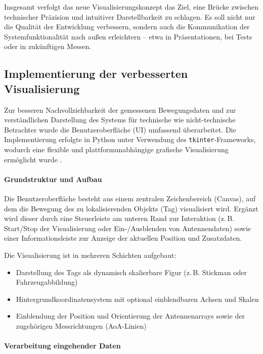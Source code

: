 \documentclass[a4paper, 12pt]{article} %
\begin{document}
Insgesamt verfolgt das neue Visualisierungskonzept das Ziel, eine Brücke zwischen technischer Präzision und intuitiver Darstellbarkeit zu schlagen. 
Es soll nicht nur die Qualität der Entwicklung verbessern, sondern auch die Kommunikation der Systemfunktionalität nach außen erleichtern – etwa in 
Präsentationen, bei Tests oder in zukünftigen Messen.

\subsection{Implementierung der verbesserten Visualisierung}

Zur besseren Nachvollziehbarkeit der gemessenen Bewegungsdaten und zur verständlichen Darstellung des Systems für technische wie nicht-technische 
Betrachter wurde die Benutzeroberfläche (\ac{UI}) umfassend überarbeitet. Die Implementierung erfolgte in Python unter Verwendung des 
\texttt{tkinter}-Frameworks, wodurch eine flexible und plattformunabhängige grafische Visualisierung ermöglicht wurde \cite{tkinter_book}.

\paragraph{Grundstruktur und Aufbau}

Die Benutzeroberfläche besteht aus einem zentralen Zeichenbereich (Canvas), auf dem die Bewegung des zu lokalisierenden Objekts (Tag) visualisiert wird. 
Ergänzt wird dieser durch eine Steuerleiste am unteren Rand zur Interaktion (z.\,B. Start/Stop der Visualisierung oder Ein-/Ausblenden von Antennendaten) 
sowie einer Informationsleiste zur Anzeige der aktuellen Position und Zusatzdaten.

Die Visualisierung ist in mehreren Schichten aufgebaut:
\begin{itemize}
    \item Darstellung des Tags als dynamisch skalierbare Figur (z.\,B. Stickman oder Fahrzeugabbildung)
    \item Hintergrundkoordinatensystem mit optional einblendbaren Achsen und Skalen
    \item Einblendung der Position und Orientierung der Antennenarrays sowie der zugehörigen Messrichtungen (\ac{AoA}-Linien)
\end{itemize}

\paragraph{Verarbeitung eingehender Daten}
\end{document}
